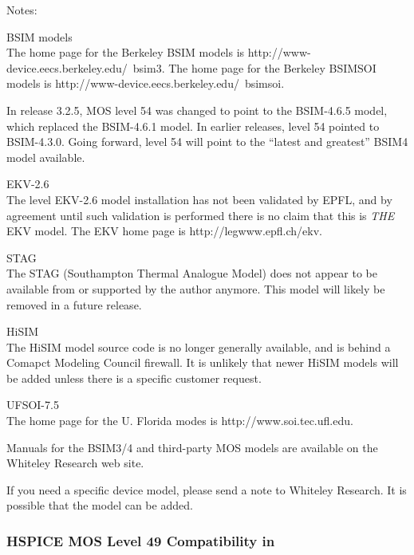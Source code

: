 Notes:\\
\begin{description}
\item{BSIM models}\\
The home page for the Berkeley BSIM models is
{\vt http://www-device.eecs.berkeley.edu/~bsim3}.
The home page for the Berkeley BSIMSOI models is
{\vt http://www-device.eecs.berkeley.edu/~bsimsoi}.

In {\WRspice} release 3.2.5, MOS level 54 was changed to point to the
BSIM-4.6.5 model, which replaced the BSIM-4.6.1 model.  In earlier
releases, level 54 pointed to BSIM-4.3.0.  Going forward, level 54
will point to the ``latest and greatest'' BSIM4 model available.

\item{EKV-2.6}\\
The level EKV-2.6 model installation has not been validated by EPFL,
and by agreement until such validation is performed there is no claim
that this is {\it THE} EKV model.  The EKV home page is {\vt
http://legwww.epfl.ch/ekv}.

\item{STAG}\\
The STAG (Southampton Thermal Analogue Model) does not appear to be
available from or supported by the author anymore.  This model will
likely be removed in a future release.

\item{HiSIM}\\
The HiSIM model source code is no longer generally available, and is
behind a Comapct Modeling Council firewall.  It is unlikely that newer
HiSIM models will be added unless there is a specific customer
request.

\item{UFSOI-7.5}\\
The home page for the U. Florida modes is
{\vt http://www.soi.tec.ufl.edu}.
\end{description}

Manuals for the BSIM3/4 and third-party MOS models are available on the
Whiteley Research web site.

If you need a specific device model, please send a note to
Whiteley Research.  It is possible that the model can be added.

\subsubsection{HSPICE MOS Level 49 Compatibility in {\WRspice}}

